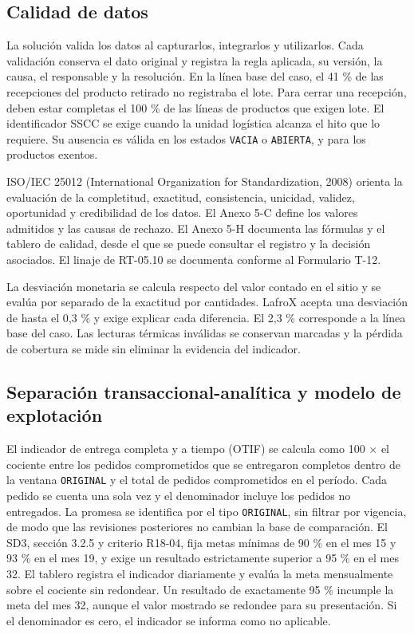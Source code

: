 \subsection{Calidad de datos}
\label{sec:sd5-5-2-5}

La solución valida los datos al capturarlos, integrarlos y utilizarlos. Cada validación conserva el dato original y registra la regla aplicada, su versión, la causa, el responsable y la resolución. En la línea base del caso, el 41 \% de las recepciones del producto retirado no registraba el lote. Para cerrar una recepción, deben estar completas el 100 \% de las líneas de productos que exigen lote. El identificador SSCC se exige cuando la unidad logística alcanza el hito que lo requiere. Su ausencia es válida en los estados \texttt{VACIA} o \texttt{ABIERTA}, y para los productos exentos.

ISO/IEC 25012 (International Organization for Standardization, 2008) orienta la evaluación de la completitud, exactitud, consistencia, unicidad, validez, oportunidad y credibilidad de los datos. El Anexo 5-C define los valores admitidos y las causas de rechazo. El Anexo 5-H documenta las fórmulas y el tablero de calidad, desde el que se puede consultar el registro y la decisión asociados. El linaje de RT-05.10 se documenta conforme al Formulario T-12.

La desviación monetaria se calcula respecto del valor contado en el sitio y se evalúa por separado de la exactitud por cantidades. LafroX acepta una desviación de hasta el 0,3 \% y exige explicar cada diferencia. El 2,3 \% corresponde a la línea base del caso. Las lecturas térmicas inválidas se conservan marcadas y la pérdida de cobertura se mide sin eliminar la evidencia del indicador.

\subsection{Separación transaccional-analítica y modelo de explotación}
\label{sec:sd5-5-2-6}

El indicador de entrega completa y a tiempo (OTIF) se calcula como 100 \ensuremath{\times} el cociente entre los pedidos comprometidos que se entregaron completos dentro de la ventana \texttt{ORIGINAL} y el total de pedidos comprometidos en el período. Cada pedido se cuenta una sola vez y el denominador incluye los pedidos no entregados. La promesa se identifica por el tipo \texttt{ORIGINAL}, sin filtrar por vigencia, de modo que las revisiones posteriores no cambian la base de comparación. El SD3, sección 3.2.5 y criterio R18-04, fija metas mínimas de 90 \% en el mes 15 y 93 \% en el mes 19, y exige un resultado estrictamente superior a 95 \% en el mes 32. El tablero registra el indicador diariamente y evalúa la meta mensualmente sobre el cociente sin redondear. Un resultado de exactamente 95 \% incumple la meta del mes 32, aunque el valor mostrado se redondee para su presentación. Si el denominador es cero, el indicador se informa como no aplicable.

